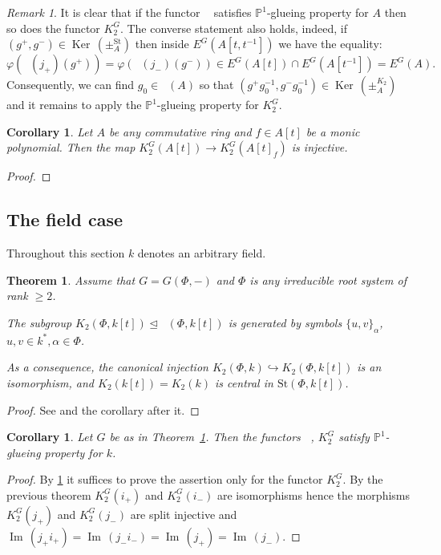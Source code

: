 \documentclass[oneside,12pt]{amsart}
\newtheorem{thm}{Theorem}
\numberwithin{equation}{section}
\numberwithin{lem}{section}
\newtheorem{cor}[lem]{Corollary}
\theoremstyle{definition}
\theoremstyle{remark}
\newtheorem{rem}[lem]{Remark}
\DeclareMathOperator{\St}{St^G}
\DeclareMathOperator{\Bigker}{Ker\,}
\DeclareMathOperator{\im}{Im\,}
\newcommand{\Stb}{\mathrm{St}}
\newcommand{\Pro}{\mathbb{P}}
\begin{document}
\begin{rem} \label{rem:stk2} It is clear that if the functor $\St$ satisfies $\Pro^1$-glueing property for $A$ then so does the functor $K_2^G$.
 The converse statement also holds, indeed, if $(g^+, g^-)\in\Bigker(\pm^{\Stb}_A)$ then inside $E^G(A[t, t^{-1}])$ we have the equality:
 $$\varphi(\St(j_+)(g^+)) = \varphi(\St(j_-)(g^-)) \in E^G(A[t]) \cap E^G(A[t^{-1}]) = E^G(A).$$
 Consequently, we can find $g_0 \in \St(A)$ so that $(g^+ g_0^{-1}, g^- g_0^{-1}) \in \Bigker(\pm_A^{K_2})$ and
 it remains to apply the $\Pro^1$-glueing property for $K_2^G$. \end{rem}

\begin{cor} Let $A$ be any commutative ring and $f\in A[t]$ be a monic polynomial.
Then the map $K_2^G(A[t])\to K_2^G(A[t]_f)$ is injective. \end{cor}
\begin{proof}
\end{proof}


\subsection{The field case}




Throughout this section $k$ denotes an arbitrary field.
\begin{thm} \label{thm:k[t]}
Assume that $G=G(\Phi, -)$ and $\Phi$ is any irreducible root system  of rank $\geq 2$.
\begin{thmlist}
\item \label{satz1} The subgroup $K_2(\Phi,k[t]) \trianglelefteq \St(\Phi,k[t])$
is generated by symbols $\{u,v\}_\alpha$, $u,v\in k^*,\alpha\in\Phi$.
\item As a consequence, the canonical injection $K_2(\Phi,k) \hookrightarrow K_2(\Phi,k[t])$ is an isomorphism,
and $K_2(k[t])=K_2(k)$ is central in $\Stb(\Phi,k[t])$.
\end{thmlist} \end{thm}
\begin{proof}
See \cite[Satz~1]{Re75} and the corollary after it.
\end{proof}

\begin{cor}\label{cor:k[t]inj}
Let $G$ be as in Theorem~\ref{thm:k[t]}. Then the functors $\St$, $K_2^G$ satisfy $\Pro^1$-glueing property for $k$. \end{cor}
\begin{proof} By \cref{rem:stk2} it suffices to prove the assertion only for the functor $K_2^G$.
By the previous theorem $K_2^G(i_+)$ and $K_2^G(i_-)$ are isomorphisms hence the morphisms $K_2^G(j_+)$ and $K_2^G(j_-)$ are split injective
and $\im(j_+i_+) = \im (j_-i_-) = \im(j_+) = \im(j_-)$.
\end{proof}
\end{document}
